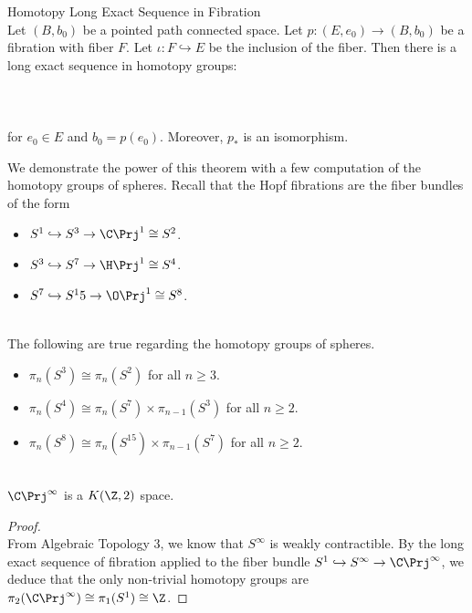 \documentclass[a4paper]{article}
\begin{document}
\begin{thm}{Homotopy Long Exact Sequence in Fibration}{}\\
Let $(B,b_0)$ be a pointed path connected space. Let $p:(E,e_0)\to(B,b_0)$ be a fibration with fiber $F$. Let $\iota:F\hookrightarrow E$ be the inclusion of the fiber. Then there is a long exact sequence in homotopy groups: \\~\\
\\~\\
for $e_0\in E$ and $b_0=p(e_0)$. Moreover, $p_\ast$ is an isomorphism. 
\end{thm}

We demonstrate the power of this theorem with a few computation of the homotopy groups of spheres. Recall that the Hopf fibrations are the fiber bundles of the form 
\begin{itemize}
\item $S^1\hookrightarrow S^3\to\C\Prj^1\cong S^2$. 
\item $S^3\hookrightarrow S^7\to\H\Prj^1\cong S^4$. 
\item $S^7\hookrightarrow S^15\to\O\Prj^1\cong S^8$. 
\end{itemize}

\begin{eg}{}{}\\
The following are true regarding the homotopy groups of spheres. 
\begin{itemize}
\item $\pi_n(S^3)\cong\pi_n(S^2)$ for all $n\geq 3$. 
\item $\pi_n(S^4)\cong\pi_n(S^7)\times\pi_{n-1}(S^3)$ for all $n\geq 2$. 
\item $\pi_n(S^8)\cong\pi_n(S^{15})\times\pi_{n-1}(S^7)$ for all $n\geq 2$. 
\end{itemize}
\end{eg}

\begin{eg}{}{}\\
$\C\Prj^\infty$ is a $K(\Z,2)$ space. 
\begin{proof}\\
From Algebraic Topology 3, we know that $S^\infty$ is weakly contractible. By the long exact sequence of fibration applied to the fiber bundle $S^1\hookrightarrow S^\infty\to\C\Prj^\infty$, we deduce that the only non-trivial homotopy groups are $\pi_2(\C\Prj^\infty)\cong\pi_1(S^1)\cong\Z$. 
\end{proof}
\end{eg}
\end{document}
